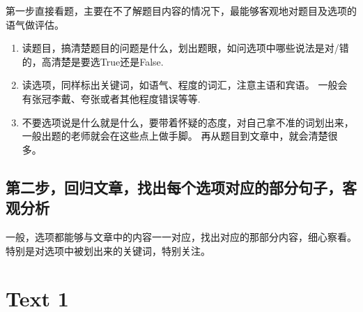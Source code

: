 \documentclass[a4paper]{ctexart}
\begin{document}
第一步直接看题，主要在不了解题目内容的情况下，最能够客观地对题目及选项的语气做评估。
\begin {enumerate}
    \item 读题目，搞清楚题目的问题是什么，划出题眼，如问选项中哪些说法是对/错的，高清楚是要选True还是False.
    \item 读选项，同样标出关键词，如语气、程度的词汇，注意主语和宾语。 一般会有张冠李戴、夸张或者其他程度错误等等.
    \item 不要选项说是什么就是什么，要带着怀疑的态度，对自己拿不准的词划出来，一般出题的老师就会在这些点上做手脚。 再从题目到文章中，就会清楚很多。
\end {enumerate}

\subsection{第二步，回归文章，找出每个选项对应的部分句子，客观分析}
一般，选项都能够与文章中的内容一一对应，找出对应的那部分内容，细心察看。 特别是对选项中被划出来的关键词，特别关注。

\section{Text 1}
\end{document}
